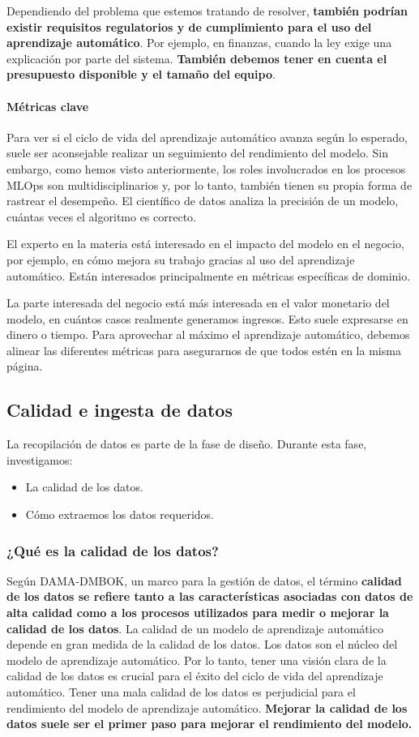 \documentclass[10pt]{book}
\begin{document}
Dependiendo del problema que estemos tratando de resolver, \textbf{también podrían existir requisitos regulatorios y de cumplimiento para el uso del aprendizaje automático}. Por ejemplo, en finanzas, cuando la ley exige una explicación por parte del sistema. \textbf{También debemos tener en cuenta el presupuesto disponible y el tamaño del equipo}.

\paragraph{Métricas clave}
Para ver si el ciclo de vida del aprendizaje automático avanza según lo esperado, suele ser aconsejable realizar un seguimiento del rendimiento del modelo. Sin embargo, como hemos visto anteriormente, los roles involucrados en los procesos MLOps son multidisciplinarios y, por lo tanto, también tienen su propia forma de rastrear el desempeño. El científico de datos analiza la precisión de un modelo, cuántas veces el algoritmo es correcto.

El experto en la materia está interesado en el impacto del modelo en el negocio, por ejemplo, en cómo mejora su trabajo gracias al uso del aprendizaje automático. Están interesados principalmente en métricas específicas de dominio.

La parte interesada del negocio está más interesada en el valor monetario del modelo, en cuántos casos realmente generamos ingresos. Esto suele expresarse en dinero o tiempo. Para aprovechar al máximo el aprendizaje automático, debemos alinear las diferentes métricas para asegurarnos de que todos estén en la misma página.


\subsection{Calidad e ingesta de datos}

La recopilación de datos es parte de la fase de diseño. Durante esta fase, investigamos: 
\begin{itemize}
	\item La calidad de los datos.
	\item Cómo extraemos los datos requeridos.
\end{itemize}

\subsubsection{¿Qué es la calidad de los datos?}
Según DAMA-DMBOK, un marco para la gestión de datos, el término \textbf{calidad de los datos se refiere tanto a las características asociadas con datos de alta calidad como a los procesos utilizados para medir o mejorar la calidad de los datos}. La calidad de un modelo de aprendizaje automático depende en gran medida de la calidad de los datos. Los datos son el núcleo del modelo de aprendizaje automático. Por lo tanto, tener una visión clara de la calidad de los datos es crucial para el éxito del ciclo de vida del aprendizaje automático. Tener una mala calidad de los datos es perjudicial para el rendimiento del modelo de aprendizaje automático. \textbf{Mejorar la calidad de los datos suele ser el primer paso para mejorar el rendimiento del modelo.}
\end{document}
